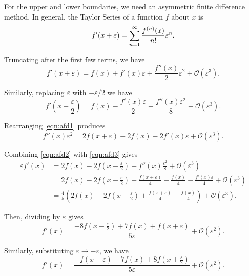 For the upper and lower boundaries, we need an asymmetric finite difference
method.
In general, the Taylor Series of a function $f$ about $x$ is
\begin{equation*}
  f'(x+\varepsilon) = \sum_{n=1}^\infty \frac{f^{(n)}(x)}{n!} \varepsilon^n. \\
\end{equation*}

Truncating after the first few terms, we have
\begin{equation}
  \label{eqn:afd1}
  f'(x+\varepsilon)  = f(x) + f'(x)\varepsilon + \frac{f''(x)}{2}\varepsilon^2 + \mathcal{O}(\varepsilon^3).
\end{equation}

Similarly, replacing $\varepsilon$ with $-\varepsilon/2$ we have
\begin{equation}
  \label{eqn:afd2}
  f'(x-\frac{\varepsilon}{2}) = f(x) - \frac{f'(x)\varepsilon}{2} + \frac{f''(x)\varepsilon^2}{8} + \mathcal{O}(\varepsilon^3).
\end{equation}

Rearranging \eqref{eqn:afd1} produces
\begin{equation}
  \label{eqn:afd3}
  f''(x)\varepsilon^2 = 2f(x+\varepsilon) - 2f(x) - 2f'(x)\varepsilon + \mathcal{O}(\varepsilon^3).
\end{equation}

Combining \eqref{eqn:afd2} with \eqref{eqn:afd3} gives
\begin{align*}
  \varepsilon f'(x) &= 2f(x) - 2f(x-\frac{\varepsilon}{2}) + f''(x)\frac{\varepsilon^2}{8} + \mathcal{O}(\varepsilon^3) \\
                    &= 2f(x) - 2f(x-\frac{\varepsilon}{2}) + \frac{f(x+\varepsilon)}{4} - \frac{f(x)}{4} - \frac{f'(x)\varepsilon}{4} + \mathcal{O}(\varepsilon^3) \\
                    &= \frac{4}{5}\left( 2f(x)-2f(x-\frac{\varepsilon}{2}) + \frac{f(x+\varepsilon)}{4} - \frac{f(x)}{4} \right) + \mathcal{O}(\varepsilon^3).
\end{align*}

Then, dividing by $\varepsilon$ gives
\begin{equation*}
  f'(x) = \frac{-8f(x-\frac{\varepsilon}{2}) + 7f(x) + f(x+\varepsilon)}{5\varepsilon} + \mathcal{O}(\varepsilon^2).
\end{equation*}

Similarly, substituting $\varepsilon \to -\varepsilon$, we have
\begin{equation*}
  f'(x) = \frac{- f(x-\varepsilon) - 7f(x) + 8f(x+\frac{\varepsilon}{2})}{5\varepsilon} + \mathcal{O}(\varepsilon^2).
\end{equation*}



